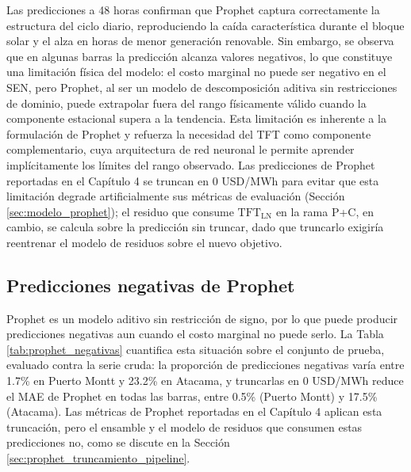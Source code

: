 Las predicciones a 48 horas confirman que Prophet captura correctamente la estructura del ciclo diario, reproduciendo la caída característica durante el bloque solar y el alza en horas de menor generación renovable. Sin embargo, se observa que en algunas barras la predicción alcanza valores negativos, lo que constituye una limitación física del modelo: el costo marginal no puede ser negativo en el SEN, pero Prophet, al ser un modelo de descomposición aditiva sin restricciones de dominio, puede extrapolar fuera del rango físicamente válido cuando la componente estacional supera a la tendencia. Esta limitación es inherente a la formulación de Prophet y refuerza la necesidad del TFT como componente complementario, cuya arquitectura de red neuronal le permite aprender implícitamente los límites del rango observado. Las predicciones de Prophet reportadas en el Capítulo 4 se truncan en 0 USD/MWh para evitar que esta limitación degrade artificialmente sus métricas de evaluación (Sección \ref{sec:modelo_prophet}); el residuo que consume $\text{TFT}_\text{LN}$ en la rama P+C, en cambio, se calcula sobre la predicción sin truncar, dado que truncarlo exigiría reentrenar el modelo de residuos sobre el nuevo objetivo.

\subsection{Predicciones negativas de Prophet}
\label{sec:prophet_negativas}

Prophet es un modelo aditivo sin restricción de signo, por lo que puede producir predicciones negativas aun cuando el costo marginal no puede serlo. La Tabla \ref{tab:prophet_negativas} cuantifica esta situación sobre el conjunto de prueba, evaluado contra la serie cruda: la proporción de predicciones negativas varía entre 1.7\% en Puerto Montt y 23.2\% en Atacama, y truncarlas en 0 USD/MWh reduce el MAE de Prophet en todas las barras, entre 0.5\% (Puerto Montt) y 17.5\% (Atacama). Las métricas de Prophet reportadas en el Capítulo 4 aplican esta truncación, pero el ensamble y el modelo de residuos que consumen estas predicciones no, como se discute en la Sección \ref{sec:prophet_truncamiento_pipeline}.

